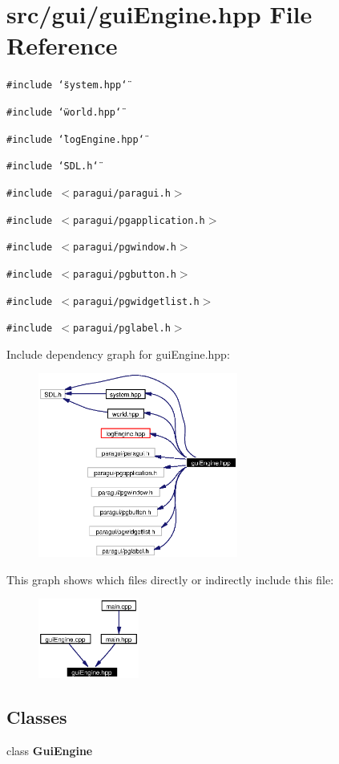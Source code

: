 \section{src/gui/gui\-Engine.hpp File Reference}
\label{guiEngine_8hpp}
{\tt \#include \char`\"{}system.hpp\char`\"{}}\par
{\tt \#include \char`\"{}world.hpp\char`\"{}}\par
{\tt \#include \char`\"{}log\-Engine.hpp\char`\"{}}\par
{\tt \#include \char`\"{}SDL.h\char`\"{}}\par
{\tt \#include $<$paragui/paragui.h$>$}\par
{\tt \#include $<$paragui/pgapplication.h$>$}\par
{\tt \#include $<$paragui/pgwindow.h$>$}\par
{\tt \#include $<$paragui/pgbutton.h$>$}\par
{\tt \#include $<$paragui/pgwidgetlist.h$>$}\par
{\tt \#include $<$paragui/pglabel.h$>$}\par


Include dependency graph for gui\-Engine.hpp:\begin{figure}[H]
\begin{center}
\leavevmode
\includegraphics[width=186pt]{guiEngine_8hpp__incl}
\end{center}
\end{figure}


This graph shows which files directly or indirectly include this file:\begin{figure}[H]
\begin{center}
\leavevmode
\includegraphics[width=94pt]{guiEngine_8hpp__dep__incl}
\end{center}
\end{figure}
\subsection*{Classes}
\begin{CompactItemize}
\item 
class {\bf Gui\-Engine}
\end{CompactItemize}
